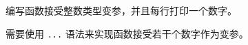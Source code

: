 \begin{Exercise}[title={变参},difficulty=5]
\label{ex:varargs}
\Question\label{ex:varargs q1}
编写函数接受整数类型变参，并且每行打印一个数字。
\end{Exercise}

\begin{Answer}
\Question
需要使用 \lstinline{...} 语法来实现函数接受若干个数字作为变参。



\end{Answer}
